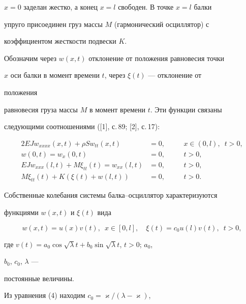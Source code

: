 $x=0$ заделан жестко, а конец $x=l$ свободен. В точке $x=l$ балки  


упруго присоединен груз массы $M$ (гармонический осциллятор) с  


коэффициентом жесткости подвески $K$.  


 


Обозначим через $w(x,t)$ отклонение от положения равновесия точки  


$x$ оси балки в момент времени $t$, через $\xi(t)$ --- отклонение от 


положения  


равновесия груза массы $M$ в момент времени $t$. Эти функции связаны  


следующими соотношениями ([1], с.\,89; [2], с.\,17): 


\begin{alignat}{2} 


E J w_{xxxx}(x,t)+\rho S w_{tt}(x,t)&=0,&\quad & 


x\in(0,l),\ \; t>0,\\ 


w(0,t)=w_x(0,t)&=0, &\quad & t>0, \\ 


E J w_{xxx}(l,t)+M \xi_{tt}(t)=w_{xx}(l,t)&=0, &\quad 


& t>0,\\ 


M \xi_{tt}(t)+K(\xi(t)+w(l,t))&=0, &\quad & t>0. 


\end{alignat} 


 


Собственные колебания системы балка--осциллятор характеризуются  


функциями $w(x,t)$ и $\xi(t)$ вида 


$$ 


w(x,t)=u(x)v(t),\ \; x\in[0,l],\quad \xi(t)= 


c_0u(l)v(t),\ \; t>0, 


$$ 


где $v(t)=a_0\cos\sqrt{\lambda}t+b_0\sin\sqrt{\lambda}t$, $t>0$; $a_0$, 


$b_0$, $c_0$, $\lambda$ --- 


постоянные величины. 


 


Из уравнения (4) находим $c_0=\varkappa/(\lambda-\varkappa)$, 


